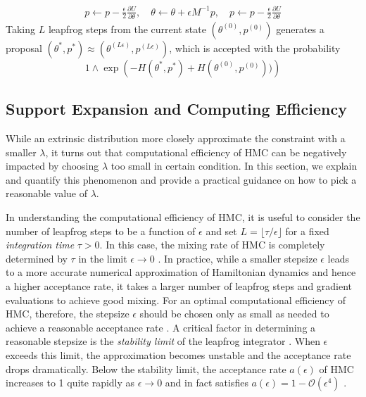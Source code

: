 \documentclass[10pt]{article}
\newcommand{\mc}[1]{\mathcal{#1}}
\DeclareMathOperator{\1}{\mathbbm{1}}
\newcommand{\dt}{\epsilon} %
\newcommand{\mass}{M} %
\begin{document}
\begin{equation}
\begin{aligned}
\label{leap-frog}
p \leftarrow p - \frac{\dt}{2} \frac{\partial U}{\partial  \theta },\quad
\theta \leftarrow  \theta  + \dt \mass^{-1}p,\quad
p \leftarrow p -  \frac{\dt}{2}  \frac{\partial U}{\partial  \theta } 
\end{aligned}
\end{equation}
Taking $L$ leapfrog steps from the current state $(\theta^{(0)},p^{(0)})$ generates a proposal $(\theta^{*},p^{*}) \approx (\theta^{(L \dt)},p^{(L \dt)})$, which is accepted with the probability 
$$1\wedge \exp  \left( - H(\theta^{*},p^{*}) + H(\theta^{(0)},p^{(0)}))\right)$$


\subsection{Support Expansion and Computing Efficiency}

While an extrinsic distribution more closely approximate the constraint with a smaller $\lambda$, it turns out that computational efficiency of HMC can be negatively impacted by choosing $\lambda$ too small in certain condition. In this section, we explain and quantify this phenomenon and provide a practical guidance on how to pick a reasonable value of $\lambda$.

In understanding the computational efficiency of HMC, it is useful to consider the number of leapfrog steps to be a function of $\dt$ and set $L = \lfloor \tau / \dt \rfloor$ for a fixed \textit{integration time} $\tau > 0$. In this case, the mixing rate of HMC is completely determined by $\tau$ in the limit $\dt \to 0$ \citep{betancourt17}. In practice, while a smaller stepsize $\dt$ leads to a more accurate numerical approximation of Hamiltonian dynamics and hence a higher acceptance rate, it takes a larger number of leapfrog steps and gradient evaluations to achieve good mixing. For an optimal computational efficiency of HMC, therefore, the stepsize $\dt$ should be chosen only as small as needed to achieve a reasonable acceptance rate \citep{beskos13, betancourt14}. A critical factor in determining a reasonable stepsize is the \textit{stability limit} of the leapfrog integrator \citep{neal2011mcmc}. When $\dt$ exceeds this limit, the approximation becomes unstable and the acceptance rate drops dramatically. Below the stability limit, the acceptance rate $a(\dt)$ of HMC increases to 1 quite rapidly as $\dt \to 0$ and in fact satisfies $a(\dt) = 1 - \mc O(\dt^4)$ \citep{beskos13}.
\end{document}
